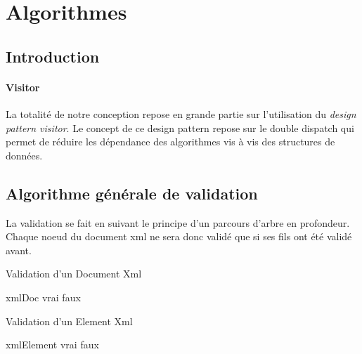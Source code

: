 \section{Algorithmes}

\subsection*{Introduction}
\paragraph{Visitor}
La totalité de notre conception repose en grande partie sur l'utilisation du \textit{design pattern visitor}. Le concept de ce design pattern repose sur le double dispatch qui permet de réduire les dépendance des algorithmes vis à vis des structures de données.\\


\subsection{Algorithme générale de validation}
La validation se fait en suivant le principe d'un parcours d'arbre en profondeur. Chaque noeud du document xml ne sera donc validé que si ses fils ont été validé avant.




\begin{algorithm}
\caption{Validation d'un Document Xml}
\begin{algorithmic}
\REQUIRE xmlDoc 
       \RETURN vrai
\ELSE
        \RETURN faux
\ENDIF 
\end{algorithmic}
\end{algorithm}

\begin{algorithm}
\caption{Validation d'un Element Xml}
\begin{algorithmic}
\REQUIRE xmlElement 
       \RETURN vrai
\ELSE
        \RETURN faux
\ENDIF 
\end{algorithmic}
\end{algorithm}
